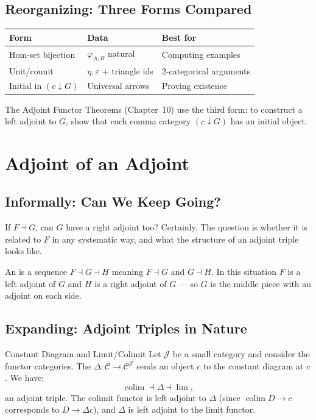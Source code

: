 \subsection{Reorganizing: Three Forms Compared}

\begin{center}
\begin{tabular}{lll}
\textbf{Form} & \textbf{Data} & \textbf{Best for} \\
\hline
Hom-set bijection & $\varphi_{A,B}$ natural & Computing examples \\
Unit/counit & $\eta, \varepsilon$ + triangle ids & 2-categorical arguments \\
Initial in $(c \downarrow G)$ & Universal arrows & Proving existence \\
\end{tabular}
\end{center}

The Adjoint Functor Theorems (Chapter~10) use the third form: to construct a
left adjoint to $G$, show that each comma category $(c \downarrow G)$ has an
initial object.


\section{Adjoint of an Adjoint}
\label{sec:adjoint-of-adjoint}

\subsection{Informally: Can We Keep Going?}

If $F \dashv G$, can $G$ have a right adjoint too? Certainly. The question is
whether it is related to $F$ in any systematic way, and what the structure of
an adjoint triple looks like.

An  is a sequence $F \dashv G \dashv H$ meaning $F \dashv G$
and $G \dashv H$. In this situation $F$ is a left adjoint of $G$ and $H$ is a
right adjoint of $G$ --- so $G$ is the middle piece with an adjoint on each side.

\subsection{Expanding: Adjoint Triples in Nature}

\begin{example}{Constant Diagram and Limit/Colimit}
Let $\mathcal{J}$ be a small category and consider the functor categories. The
 $\Delta : \mathcal{C} \to \mathcal{C}^\mathcal{J}$ sends
an object $c$ to the constant diagram at $c$. We have:
\begin{equation*}
  \operatorname{colim} \dashv \Delta \dashv \lim,
\end{equation*}
an adjoint triple. The colimit functor is left adjoint to $\Delta$ (since
$\operatorname{colim} D \to c$ corresponds to $D \to \Delta c$), and $\Delta$ is
left adjoint to the limit functor.
\end{example}

